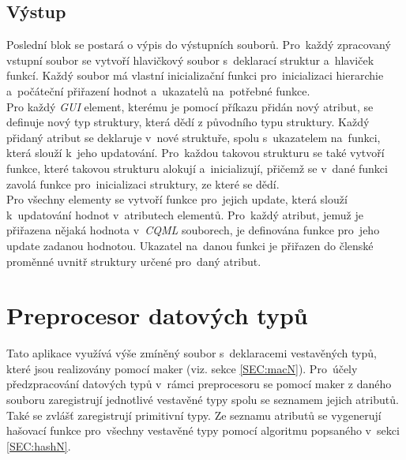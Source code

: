 \documentclass[11pt,twoside,a4paper]{book}
\begin{document}
\subsection{Výstup}
Poslední blok se postará o výpis do výstupních souborů. Pro~každý zpracovaný vstupní soubor se vytvoří hlavičkový soubor s~deklarací struktur a~hlaviček funkcí. Každý soubor má vlastní inicializační funkci pro~inicializaci hierarchie a~počáteční přiřazení hodnot a~ukazatelů na~potřebné funkce.\\
Pro každý \textit{GUI} element, kterému je pomocí příkazu přidán nový atribut, se definuje nový typ struktury, která dědí z původního typu struktury. Každý přidaný atribut se deklaruje v~nové struktuře, spolu s~ukazatelem na~funkci, která slouží k~jeho updatování. Pro~každou takovou strukturu se také vytvoří funkce, které takovou strukturu alokují a~inicializují, přičemž se v~dané funkci zavolá funkce pro~inicializaci struktury, ze které se dědí.\\
Pro všechny elementy se vytvoří funkce pro~jejich update, která slouží k~updatování hodnot v~atributech elementů. Pro~každý atribut, jemuž je přiřazena nějaká hodnota v~\textit{CQML} souborech, je definována funkce pro~jeho update zadanou hodnotou. Ukazatel na~danou funkci je přiřazen do členské proměnné uvnitř struktury určené pro~daný atribut.\\  %


\section{\label{SEC:prepN}Preprocesor datových typů}
Tato aplikace využívá výše zmíněný soubor s~deklaracemi vestavěných typů, které jsou realizovány pomocí maker (viz. sekce \ref{SEC:macN}). Pro~účely předzpracování datových typů v~rámci preprocesoru se pomocí maker z daného souboru zaregistrují jednotlivé vestavěné typy spolu se seznamem jejich atributů. Také se zvlášť zaregistrují primitivní typy. Ze seznamu atributů se vygenerují hašovací funkce pro~všechny vestavěné typy pomocí algoritmu popsaného v~sekci \ref{SEC:hashN}.\\
\end{document}

